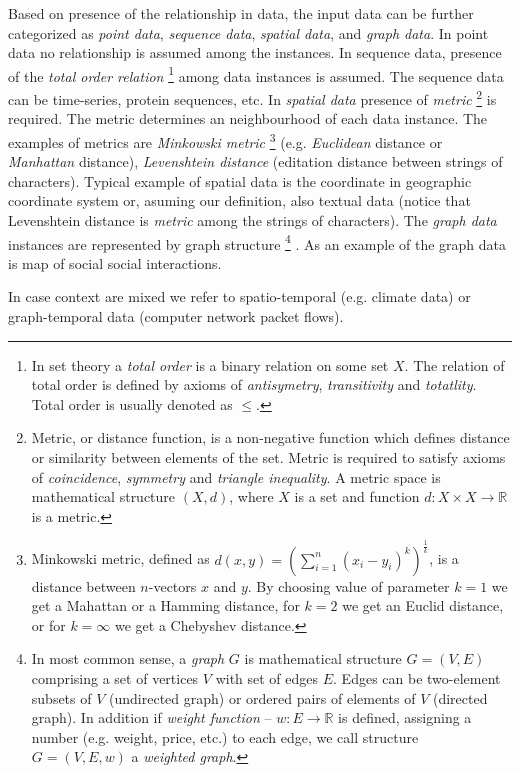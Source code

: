 Based on presence of the relationship in data, the input data can be further categorized as
\emph{point data}, \emph{sequence data}, \emph{spatial data}, and \emph{graph data}. 
In point data no relationship is assumed among the instances.
In sequence data, presence of the \emph{total order relation}%
\footnote{%
 	In set theory a \emph{total order} is a binary relation on some set $X$. 
	The relation of total order is defined by axioms of \emph{antisymetry}, \emph{transitivity} 
	and \emph{totatlity}. Total order is usually denoted as $\le$.
} %
among data instances is assumed. The sequence data can be time-series, protein sequences, etc.
In \emph{spatial data} presence of \emph{metric}%
\footnote{
	Metric, or distance function, is a non-negative function which defines distance or 
	similarity between elements of the set. Metric is required to satisfy axioms of
	\emph{coincidence}, \emph{symmetry} and \emph{triangle inequality}.
	A metric space is mathematical structure $(X,d)$, where $X$ is a set and function  
	$d:X \times X \rightarrow \mathbb{R}$ is a metric. 
} %
is required. 
The metric determines an neighbourhood of each data instance. The examples of metrics are
\emph{Minkowski metric}%
\footnote{
	Minkowski metric, defined as $ d(x,y) = (\sum_{i=1}^n(x_i-y_i)^k )^\frac{1}{k}$, 
	is a distance between $n$-vectors $x$ and $y$.
	By choosing value of parameter $k=1$ we get a Mahattan or  a Hamming distance, 
	for $k=2$ we get an Euclid distance, or for $k=\infty $ we get a Chebyshev distance.
} %
(e.g. \emph{Euclidean} distance or \emph{Manhattan} distance), \emph{Levenshtein distance}
(editation distance between strings of characters). Typical example of spatial data is the
coordinate in geographic coordinate system or, asuming our definition, also textual data 
(notice that Levenshtein distance is \emph{metric} among the strings of characters).
The \emph{graph data} instances are represented by graph structure%
\footnote{
	In most common sense, a \emph{graph} $G$ is mathematical structure $G=\left(V,E\right)$
	comprising a set of vertices $V$ with set of edges $E$.
	Edges can be two-element subsets of  $V$ (undirected graph) or ordered pairs 
	of elements of $V$ (directed graph).
	In addition if \emph{weight function} -- $w:E\rightarrow \mathbb{R} $ is defined, 
	assigning a number (e.g. weight, price, etc.) to each edge, we call structure
	$G=\left( V,E,w \right)$ a \emph{weighted graph}.
}%
. As an example of the graph data is map of social social interactions.

In case context are mixed we refer to spatio-temporal (e.g. climate data) or 
graph-temporal data (computer network packet flows).

